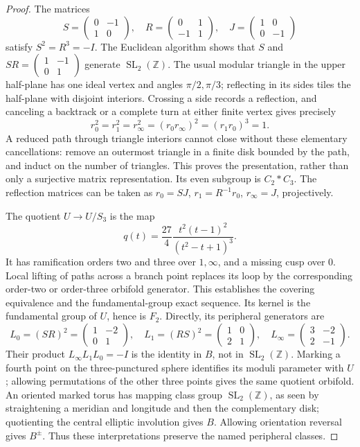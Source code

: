 \begin{proof}
The matrices
\[
 S=\begin{pmatrix}0&-1\\1&0\end{pmatrix},\quad
 R=\begin{pmatrix}0&1\\-1&1\end{pmatrix},\quad
 J=\begin{pmatrix}1&0\\0&-1\end{pmatrix}
\]
satisfy $S^2=R^3=-I$. The Euclidean algorithm shows that $S$ and $SR=\left(\begin{smallmatrix}1&-1\\0&1\end{smallmatrix}\right)$ generate $\operatorname{SL}_2(\mathbb Z)$. The usual modular triangle in the upper half-plane has one ideal vertex and angles $\pi/2,\pi/3$; reflecting in its sides tiles the half-plane with disjoint interiors. Crossing a side records a reflection, and canceling a backtrack or a complete turn at either finite vertex gives precisely
\[
 r_0^2=r_1^2=r_\infty^2=(r_0r_\infty)^2=(r_1r_0)^3=1.
\]
A reduced path through triangle interiors cannot close without these elementary cancellations: remove an outermost triangle in a finite disk bounded by the path, and induct on the number of triangles. This proves the presentation, rather than only a surjective matrix representation. Its even subgroup is $C_2*C_3$. The reflection matrices can be taken as $r_0=SJ$, $r_1=R^{-1}r_0$, $r_\infty=J$, projectively.

The quotient $U\to U/S_3$ is the map
\[
 q(t)=\frac{27}{4}\frac{t^2(t-1)^2}{(t^2-t+1)^3}.
\]
It has ramification orders two and three over $1,\infty$, and a missing cusp over $0$. Local lifting of paths across a branch point replaces its loop by the corresponding order-two or order-three orbifold generator. This establishes the covering equivalence and the fundamental-group exact sequence. Its kernel is the fundamental group of $U$, hence is $F_2$. Directly, its peripheral generators are
\[
 L_0=(SR)^2=\begin{pmatrix}1&-2\\0&1\end{pmatrix},\quad
 L_1=(RS)^2=\begin{pmatrix}1&0\\2&1\end{pmatrix},\quad
 L_\infty=\begin{pmatrix}3&-2\\2&-1\end{pmatrix}.
\]
Their product $L_\infty L_1L_0=-I$ is the identity in $B$, not in $\operatorname{SL}_2(\mathbb Z)$. Marking a fourth point on the three-punctured sphere identifies its moduli parameter with $U$; allowing permutations of the other three points gives the same quotient orbifold. An oriented marked torus has mapping class group $\operatorname{SL}_2(\mathbb Z)$, as seen by straightening a meridian and longitude and then the complementary disk; quotienting the central elliptic involution gives $B$. Allowing orientation reversal gives $B^\pm$. Thus these interpretations preserve the named peripheral classes.


\end{proof}
